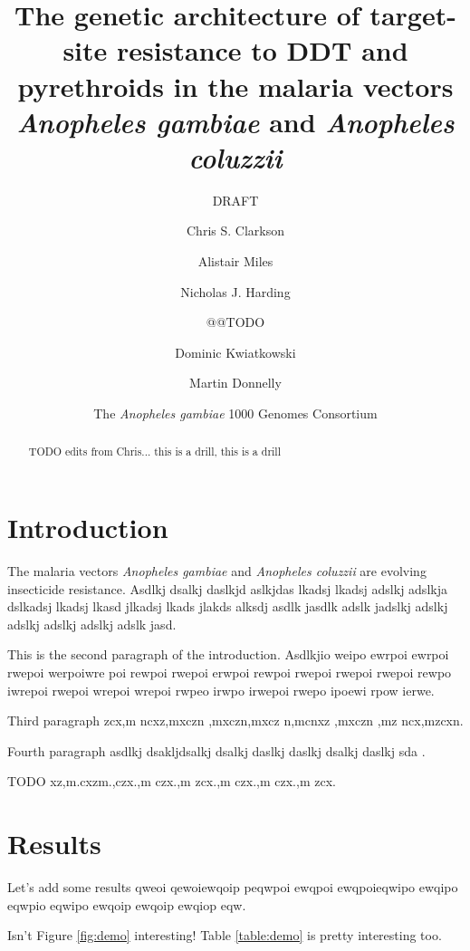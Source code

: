 \documentclass[a4paper,10pt,abstracton]{scrartcl}
\title{
The genetic architecture of target-site resistance to DDT and pyrethroids in the malaria vectors \emph{Anopheles gambiae} and \emph{Anopheles coluzzii}
}
\subtitle{DRAFT}
\author[1]{Chris S. Clarkson}
\author[2,1]{Alistair Miles}
\author[2]{Nicholas J. Harding}
\author{@@TODO}
\author[1,2]{Dominic Kwiatkowski}
\author[3,1]{Martin Donnelly}
\author[4]{The \emph{Anopheles gambiae} 1000 Genomes Consortium}
\affil[1]{Sanger @@TODO}
\affil[2]{Oxford @@TODO}
\affil[3]{Liverpool @@TODO}
\affil[4]{MalariaGEN @@TODO}
\begin{document}
\maketitle

\begin{abstract}

TODO edits from Chris...
%
this is a drill, this is a drill

\end{abstract}

\section*{Introduction}

The malaria vectors \emph{Anopheles gambiae} and \emph{Anopheles coluzzii} are evolving insecticide resistance.
%
Asdlkj dsalkj daslkjd aslkjdas lkadsj lkadsj adslkj adslkja dslkadsj lkadsj lkasd jlkadsj lkads jlakds alksdj asdlk jasdlk adslk jadslkj adslkj adslkj adslkj adslkj adslk jasd.

This is the second paragraph of the introduction.
%
Asdlkjio weipo ewrpoi ewrpoi rwepoi werpoiwre poi rewpoi rwepoi erwpoi rewpoi rwepoi rwepoi rwepoi rewpo iwrepoi rwepoi wrepoi wrepoi rwpeo irwpo irwepoi rwepo ipoewi rpow ierwe.

Third paragraph zcx,m ncxz,mxczn ,mxczn,mxcz n,mcnxz ,mxczn ,mz ncx,mzcxn.

Fourth paragraph asdlkj dsakljdsalkj dsalkj daslkj daslkj dsalkj daslkj sda \cite{Garud2015}.

TODO xz,m.cxzm.,czx.,m czx.,m zcx.,m czx.,m czx.,m zcx.

\section*{Results}

Let's add some results qweoi qewoiewqoip peqwpoi ewqpoi ewqpoieqwipo ewqipo eqwpio eqwipo ewqoip ewqoip ewqiop eqw.

Isn't Figure \ref{fig:demo} interesting! 
%
Table \ref{table:demo} is pretty interesting too.

\begin{landscape}
\begin{table}[h]
  \small
  \centering
  
  \caption{
\textbf{Non-synonymous mutations in the voltage-gated sodium channel gene}. 
%
All mutations are at 5\% frequency or above in one or more of the 9 Ag1000G phase 1 populations, with the exception of \texttt{2,400,071 G>T} which is only found in the CM\emph{Ag} population at 0.4\% frequency but is included because another mutation (\texttt{2,400,071 G>A}) is found at the same position causing the same amino acid substitution (\texttt{M490I}). 
%
Substitutions marked with an asterisk (*) failed conservative variant filters applied genome-wide in the Ag1000G phase 1 AR3 callset, but appeared sound on manual inspection of read alignments.
}
  \label{table:variants_missense}
\end{table}
\end{landscape}
\end{document}
